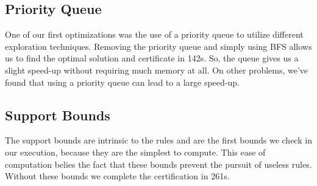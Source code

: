 \subsection{Priority Queue} \label{exp:priority}

One of our first optimizations was the use of a priority queue to utilize different exploration techniques. 
Removing the priority queue and simply using BFS allows us to find the optimal solution and certificate in 142s.
So, the queue gives us a slight speed-up without requiring much memory at all.
On other problems, we've found that using a priority queue can lead to a large speed-up.

\subsection{Support Bounds}

The support bounds are intrinsic to the rules and are the first bounds we check in our execution, because they are the simplest to compute.
This ease of computation belies the fact that these bounds prevent the pursuit of useless rules.
Without these bounds we complete the certification in 261s.

